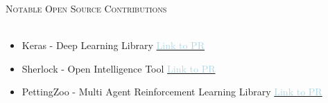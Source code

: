 \documentclass[a4paper]{article}
\newcommand{\lineunder} {
    \vspace*{-8pt} \\
    \hspace*{-18pt} \hrulefill \\
}
\newcommand{\header} [1] {
    {\hspace*{-18pt}\vspace*{6pt} \textsc{#1}}
    \vspace*{-6pt} \lineunder
}
\begin{document}
\vspace{1mm}
\header{Notable Open Source Contributions}
\vspace{-3mm}
\begin{itemize} \itemsep 0.5pt
	\item \begin{normalsize} Keras - Deep Learning Library \hfill \href{https://github.com/keras-team/keras/pull/19829}{\textcolor{lightblue}{Link to PR}} \end{normalsize}
	\vspace{-2mm}
    \item \begin{normalsize} Sherlock - Open Intelligence Tool \hfill \href{https://github.com/sherlock-project/sherlock/pull/2142}{\textcolor{lightblue}{Link to PR}} \end{normalsize}
	\vspace{-2mm}
    \item \begin{normalsize} PettingZoo - Multi Agent Reinforcement Learning Library \hfill \href{https://github.com/Farama-Foundation/PettingZoo/pull/1213}{\textcolor{lightblue}{Link to PR}} \end{normalsize}
	\vspace{-2mm}
\end{itemize}
\end{document}
